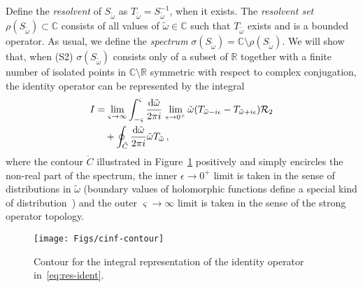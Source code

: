 \documentclass[aps, prd, amsmath, floats, floatfix, twocolumn, nofootinbib, superscriptaddress, showpacs]{revtex4-1}
\def\bC{{\mathbb C}}
\def\bR{{\mathbb R}}
\def\oo{\infty}
\def\cR{\mathcal{R}}
\def\tomega{{\tilde{\omega}}}
\begin{document}
Define the \emph{resolvent} of $S_\tomega$ as $T_\tomega = S_\tomega^{-1}$,
when it exists. The \emph{resolvent set} $\rho(S_\tomega) \subset \bC$ consists
of all values of $\tomega \in \bC$ such that $T_\tomega$ exists and is a
bounded operator. As usual, we define the \emph{spectrum} $\sigma(S_\tomega) =
\bC \setminus \rho(S_\tomega)$. We will show that, when (S2) $\sigma(S_\tomega)$
consists only of a subset of $\bR$ together with a finite number of
isolated points in $\bC \setminus \bR$ symmetric with respect to complex
conjugation, the identity operator can be represented by the
integral
\begin{align} \label{eq:res-ident}
I &= \lim_{\varsigma\to\oo} \int_{-\varsigma}^\varsigma
\frac{\dd\tomega}{2\pi i} \,
\lim_{\epsilon\to 0^+} \tomega (T_{\tomega-i\epsilon} - T_{\tomega+i\epsilon}) \cR_2 \notag \\
&\quad + \oint_{\mathring{C}} \frac{\dd\tomega}{2\pi i} \tomega T_\tomega \, ,
\end{align}
where the contour $\mathring{C}$ illustrated in Figure~\ref{fig:contour}
positively and simply encircles the non-real part of the spectrum, the
inner $\epsilon \to 0^+$ limit is taken in the sense of distributions in
$\tomega$ (boundary values of holomorphic functions define a special
kind of distribution~\cite[Ch.IX]{hoermander}) and the outer $\varsigma
\to \oo$ limit is taken in the sense of the strong operator topology.

\begin{figure}
	\begin{center}
		\texttt{[image: Figs/cinf-contour]}
	\end{center}
	\caption{Contour for the integral representation of the identity
		operator in~\eqref{eq:res-ident}.}
	\label{fig:contour}
\end{figure}
\end{document}
